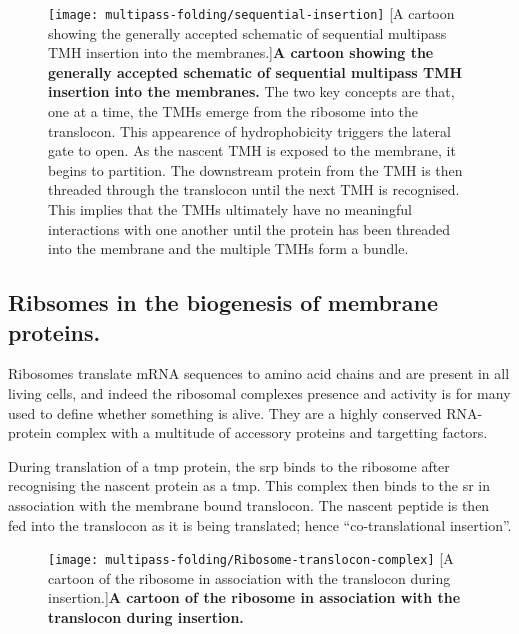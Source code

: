 \begin{figure}[!ht]
\centering
\texttt{[image: multipass-folding/sequential-insertion]}
        [A cartoon showing the generally accepted schematic of sequential multipass TMH insertion into the membranes.]{\textbf{A cartoon showing the generally accepted schematic of sequential multipass TMH insertion into the membranes.}
        The two key concepts are that, one at a time, the TMHs emerge from the ribosome into the translocon.
        This appearence of hydrophobicity triggers the lateral gate to open.
        As the nascent TMH is exposed to the membrane, it begins to partition.
        The downstream protein from the TMH is then threaded through the translocon until the next TMH is recognised.
        This implies that the TMHs ultimately have no meaningful interactions with one another until the protein has been threaded into the membrane and the multiple TMHs form a bundle.
}
\label{fig:sequential-insertion}
\end{figure}

\subsection{Ribsomes in the biogenesis of membrane proteins.}
Ribosomes translate mRNA sequences to amino acid chains and are present in all living cells, and indeed the ribosomal complexes presence and activity is for many used to define whether something is alive.
They are a highly conserved RNA-protein complex with a multitude of accessory proteins and targetting factors.

During translation of a \gls{tmp} protein, the \gls{srp} binds to the ribosome after recognising the nascent protein as a \gls{tmp}.
This complex then binds to the \gls{sr} in association with the membrane bound translocon.
The nascent peptide is then fed into the translocon as it is being translated; hence ``co-translational insertion''.

\begin{figure}[!ht]
\centering
\texttt{[image: multipass-folding/Ribosome-translocon-complex]}
        [A cartoon of the ribosome in association with the translocon during insertion.]{\textbf{A cartoon of the ribosome in association with the translocon during insertion.}
}
\label{fig:Ribosome-translocon-complex}
\end{figure}

